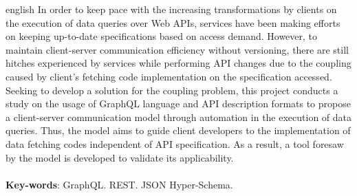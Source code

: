 \begin{resumo}[Abstract]
  \begin{otherlanguage*}{english}
    In order to keep pace with the increasing transformations by clients on the execution of data queries over Web APIs, services have been making efforts on keeping up-to-date specifications based on access demand. However, to maintain client-server communication efficiency without versioning, there are still hitches experienced by services while performing API changes due to the coupling caused by client's fetching code implementation on the specification accessed. Seeking to develop a solution for the coupling problem, this project conducts a study on the usage of GraphQL language and API description formats to propose a client-server communication model through automation in the execution of data queries. Thus, the model aims to guide client developers to the implementation of data fetching codes independent of API specification. As a result, a tool foresaw by the model is developed to validate its applicability. \\ \\
    \textbf{Key-words}: GraphQL. REST. JSON Hyper-Schema.
  \end{otherlanguage*}
\end{resumo}

